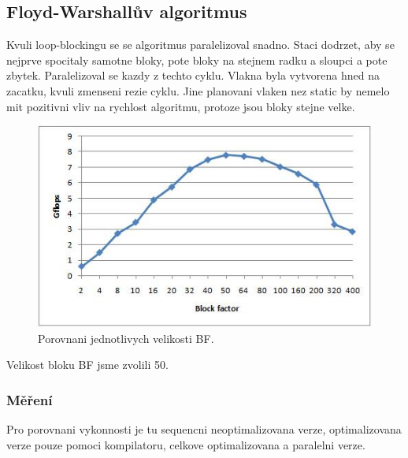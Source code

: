 \documentclass[a4paper,11pt]{article}
\begin{document}
\subsection{Floyd-Warshallův algoritmus}
Kvuli loop-blockingu se se algoritmus paralelizoval snadno. Staci dodrzet, aby se nejprve spocitaly samotne bloky, pote bloky na stejnem radku a sloupci a pote zbytek. Paralelizoval se kazdy z techto cyklu. Vlakna byla vytvorena hned na zacatku, kvuli zmenseni rezie cyklu. Jine planovani vlaken nez static by nemelo mit pozitivni vliv na rychlost algoritmu, protoze jsou bloky stejne velke.

\begin{figure}[H]
  \begin{center}
    \includegraphics[scale=0.7]{bf.jpg}
  \end{center}
  \caption{Porovnani jednotlivych velikosti BF.}\label{graf:fig8}
\end{figure}

Velikost bloku BF jsme zvolili 50.
\subsubsection{Měření}
Pro porovnani vykonnosti je tu sequencni neoptimalizovana verze, optimalizovana verze pouze pomoci kompilatoru, celkove optimalizovana a paralelni verze.
\end{document}
